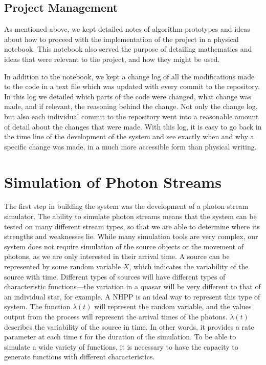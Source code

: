 \documentclass[a4paper,11pt]{article}
\begin{document}
\subsection{Project Management}
\label{sec-4-5}

   As mentioned above, we kept detailed notes of algorithm prototypes and ideas
   about how to proceed with the implementation of the project in a physical
   notebook. This notebook also served the purpose of detailing mathematics and
   ideas that were relevant to the project, and how they might be used. 

   In addition to the notebook, we kept a change log of all the modifications
   made to the code in a text file which was updated with every commit to the
   repository. In this log we detailed which parts of the code were changed,
   what change was made, and if relevant, the reasoning behind the change. Not
   only the change log, but also each individual commit to the repository went
   into a reasonable amount of detail about the changes that were made. With
   this log, it is easy to go back in the time line of the development of the
   system and see exactly when and why a specific change was made, in a much
   more accessible form than physical writing. 
\section{Simulation of Photon Streams}
\label{sec-5}

  The first step in building the system was the development of a photon stream
  simulator. The ability to simulate photon streams means that the system can be
  tested on many different stream types, so that we are able to determine where
  its strengths and weaknesses lie. While many simulation tools are very complex,
  our system does not require simulation of the source objects or the movement of
  photons, as we are only interested in their arrival time. A source can be
  represented by some random variable $X$, which indicates the variability of the
  source with time. Different types of sources will have different types of
  characteristic functions---the variation in a quasar will be very different to
  that of an individual star, for example. A NHPP is an ideal way to represent
  this type of system. The function $\lambda(t)$ will represent the random
  variable, and the values output from the process will represent the arrival
  times of the photons. $\lambda(t)$ describes the variability of the source in
  time. In other words, it provides a rate parameter at each time $t$ for the
  duration of the simulation. To be able to simulate a wide variety of functions,
  it is necessary to have the capacity to generate functions with different
  characteristics.
\end{document}

